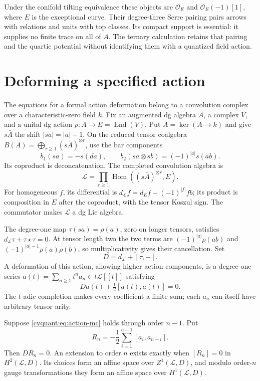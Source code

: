 Under the conifold tilting equivalence these objects are
$\mathcal O_E$ and $\mathcal O_E(-1)[1]$, where $E$ is the exceptional curve.
Their degree-three Serre pairing pairs arrows with relations and units
with top classes.  Its compact support is essential: it supplies no
finite trace on all of $A$.  The ternary calculation retains that
pairing and the quartic potential without identifying them with a
quantized field action.

\section{Deforming a specified action}
\label{cyquant:sec:formal-actions}

The equations for a formal action deformation belong to a convolution
complex over a characteristic-zero field $k$.  Fix an augmented dg
algebra $A$, a complex $V$, and a unital
dg action $\rho:A\to E=\operatorname{End}(V)$.  Put
$\bar A=\ker(A\to k)$ and give $s\bar A$ the shift $|sa|=|a|-1$.
On the reduced tensor coalgebra
$B(A)=\bigoplus_{r\geq1}(s\bar A)^{\otimes r}$, use the bar components
\[
 b_1(sa)=-s(da),\qquad b_2(sa\otimes sb)=(-1)^{|a|}s(ab).
\]
Its coproduct is deconcatenation.  The completed convolution algebra is
\[
 \mathcal L=\prod_{r\geq1}
       \operatorname{Hom}((s\bar A)^{\otimes r},E).
\]
For homogeneous $f$, its differential is
$d_{\mathcal L}f=d_Ef-(-1)^{|f|}fb$; its product is composition in $E$
after the coproduct, with the tensor Koszul sign.  The commutator makes
$\mathcal L$ a dg Lie algebra.

The degree-one map $\tau(sa)=\rho(a)$, zero on longer tensors, satisfies
$d_{\mathcal L}\tau+\tau\star\tau=0$.  At tensor length two the two
terms are $(-1)^{|a|}\rho(ab)$ and
$(-1)^{|a|-1}\rho(a)\rho(b)$, so multiplicativity gives their
cancellation.  Set
\[
 D=d_{\mathcal L}+[\tau,-].
\]
A deformation of this action, allowing higher action components, is a
degree-one series $a(t)=\sum_{n\geq1}t^na_n\in t\mathcal L[[t]]$
satisfying
\begin{equation}\label{cyquant:eq:action-mc}
 Da(t)+\tfrac12[a(t),a(t)]=0.
\end{equation}
The $t$-adic completion makes every coefficient a finite sum; each
$a_n$ can itself have arbitrary tensor arity.

\begin{proposition}\label{cyquant:prop:action-obstructions}
Suppose \eqref{cyquant:eq:action-mc} holds through order $n-1$.  Put
\[
 R_n=-\frac12\sum_{i=1}^{n-1}[a_i,a_{n-i}].
\]
Then $DR_n=0$.  An extension to order $n$ exists exactly when
$[R_n]=0$ in $H^2(\mathcal L,D)$.  Its choices form an affine space
over $Z^1(\mathcal L,D)$, and modulo order-$n$ gauge transformations
they form an affine space over $H^1(\mathcal L,D)$.
\end{proposition}


